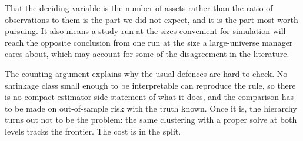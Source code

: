 \documentclass[11pt]{article}
\begin{document}
That the deciding variable is the number of assets rather than the ratio of
observations to them is the part we did not expect, and it is the part most
worth pursuing. It also means a study run at the sizes convenient for
simulation will reach the opposite conclusion from one run at the size a
large-universe manager cares about, which may account for some of the
disagreement in the literature.

The counting argument explains why the usual defences are hard to check. No
shrinkage class small enough to be interpretable can reproduce the rule, so
there is no compact estimator-side statement of what it does, and the
comparison has to be made on out-of-sample risk with the truth known. Once it
is, the hierarchy turns out not to be the problem: the same clustering with a
proper solve at both levels tracks the frontier. The cost is in the split.

\printbibliography
\end{document}
